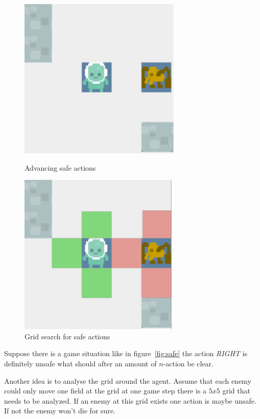 \begin{figure}
\centering
\begin{minipage}{.5\textwidth}
  \centering
\includegraphics[scale=0.8]{images/safe.pdf}
\caption{Advancing safe actions}
\label{fig:safe}
\end{minipage}%
\begin{minipage}{.5\textwidth}
\centering
\includegraphics[scale=0.8]{images/safe_grid.pdf}
\caption{Grid search for safe actions}
\label{fig:safe_grid}
\end{minipage}
\end{figure}



Suppose there is a game situation like in figure~\ref{fig:safe} the action \textit{RIGHT} is definitely unsafe what 
should after an amount of $n$-action be clear.

Another idea is to analyse the grid around the agent. Assume that each enemy could only move one field at the grid
at one game step there is a $5x5$ grid that needs to be analyzed. If an enemy at this grid exists one action is
maybe unsafe. If not the enemy won't die for sure.





